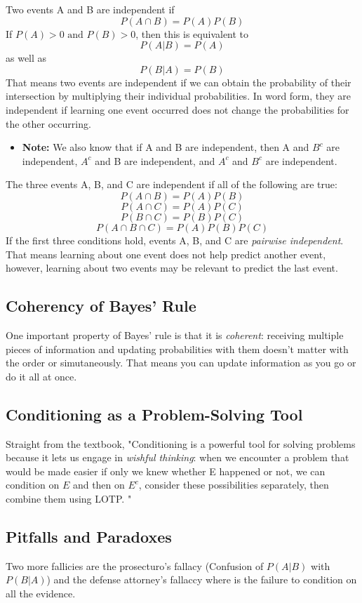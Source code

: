 \documentclass[12pt, letterpaper]{article}
\begin{document}
Two events A and B are independent if \[P(A \cap B) = P(A)P(B) \]
If \(P(A) > 0 \text{ and } P(B) > 0\), then this is equivalent to \[P(A|B) = P(A) \] as well as \[P(B|A) = P(B) \]
That means two events are independent if we can obtain the probability of their intersection by multiplying their individual probabilities. In word form, they are independent if learning one event occurred does not change the probabilities for the other occurring.
\begin{itemize}
    \item \textbf{Note: }We also know that if A and B are independent, then A and \(B^c\) are independent, \(A^c\) and B are independent, and \(A^c\) and \(B^c\) are independent.
\end{itemize}
The three events A, B, and C are independent if all of the following are true:
\[P(A \cap B) = P(A)P(B)\] \[P(A \cap C) = P(A)P(C)\] \[P(B \cap C) = P(B)P(C) \] \[P(A \cap B \cap C) = P(A)P(B)P(C) \]
If the first three conditions hold, events A, B, and C are \textit{pairwise independent}. That means learning about one event does not help predict another event, however, learning about two events may be relevant to predict the last event.

\subsection{Coherency of Bayes' Rule}

One important property of Bayes' rule is that it is \textit{coherent}: receiving multiple pieces of information and updating probabilities with them doesn't matter with the order or simutaneously. That means you can update information as you go or do it all at once.

\subsection{Conditioning as a Problem-Solving Tool}

Straight from the textbook, "Conditioning is a powerful tool for solving problems because it lets us engage in
\textit{wishful thinking}: when we encounter a problem that would be made easier if only
we knew whether E happened or not, we can condition on \(E\) and then on \(E^c\),
consider these possibilities separately, then combine them using LOTP.
"

\subsection{Pitfalls and Paradoxes}

Two more fallicies are the prosecturo's fallacy (Confusion of \(P(A|B)\) with \(P(B|A)\)) and the defense attorney's fallaccy where is the failure to condition on all the evidence.
\end{document}
